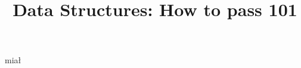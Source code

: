 \documentclass[11pt,a4paper]{report}
\title{Data Structures: How to pass 101}
\begin{document}
miał
\end{document}
